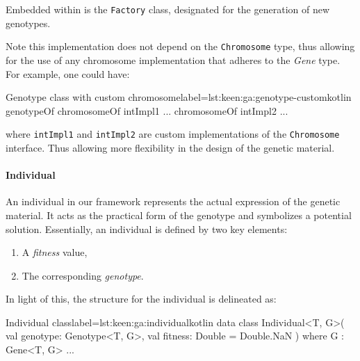     Embedded within is the \texttt{Factory} class, designated for the 
    generation of new genotypes.

    Note this implementation does not depend on the \texttt{Chromosome} type,
    thus allowing for the use of any chromosome implementation that adheres to
    the \textit{Gene} type. For example, one could have:

    \begin{code}{Genotype class with custom chromosome}{label={lst:keen:ga:genotype-custom}}{kotlin}
      genotypeOf {
          chromosomeOf {
              intImpl1 { ... }
          }
          chromosomeOf {
              intImpl2 { ... }
          }
      }
    \end{code}

    \noindent where \texttt{intImpl1} and \texttt{intImpl2} are custom 
    implementations of the \texttt{Chromosome} interface.
    Thus allowing more flexibility in the design of the genetic material.

  \paragraph{Individual}
    An individual in our framework represents the actual expression of the genetic material. It acts as the practical form of the genotype and symbolizes a potential solution. Essentially, an individual is defined by two key elements:
    \begin{enumerate}
        \item A \textit{fitness} value,
        \item The corresponding \textit{genotype}.
    \end{enumerate}
    
    In light of this, the structure for the individual is delineated as:
    
    \begin{code}{Individual class}{label={lst:keen:ga:individual}}{kotlin}
      data class Individual<T, G>(
          val genotype: Genotype<T, G>,
          val fitness: Double = Double.NaN
      ) where G : Gene<T, G> { ... }
    \end{code}

